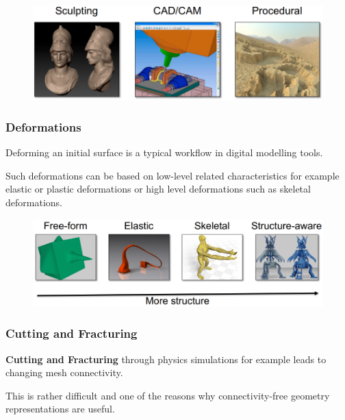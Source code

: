 \documentclass{article}
\begin{document}
\begin{figure}[!ht]
    \centering
    \includegraphics[width=0.8\linewidth]{images/modelling_tools.png}
\end{figure}


\subsubsection{Deformations}

\vspace{5px}

Deforming an initial surface is a typical workflow in digital modelling tools.

Such deformations can be based on low-level related characteristics for example elastic or plastic deformations
or high level deformations such as skeletal deformations.

\begin{figure}[!ht]
    \centering
    \includegraphics[width=0.8\linewidth]{images/deformations.png}
\end{figure}

\subsubsection{Cutting and Fracturing}

\vspace{5px}

\textbf{Cutting and Fracturing} through physics simulations for example
leads to changing mesh connectivity. 

This is rather difficult and one of
the reasons why connectivity-free geometry representations are useful.

\vspace{10px}

\newpage
\end{document}
